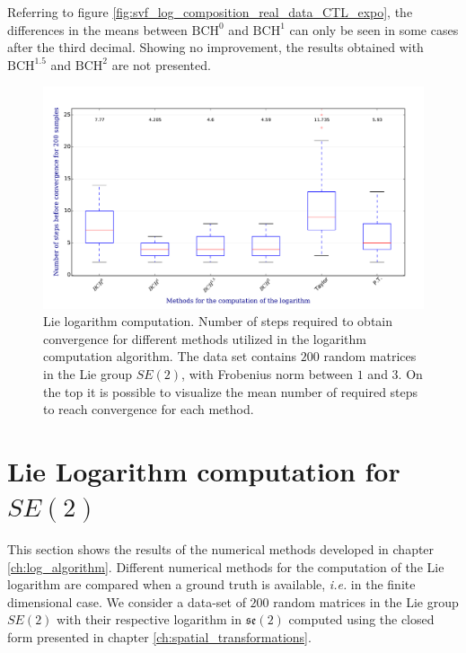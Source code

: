 Referring to figure \ref{fig:svf_log_composition_real_data_CTL_expo}, the differences in the means between $\text{BCH}^0$ and $\text{BCH}^{1}$ can only be seen in some cases after the third decimal. 
Showing no improvement, the results obtained with $\text{BCH}^{1.5}$ and $\text{BCH}^2$ are not presented.

\begin{figure}[!ht]
	\centering
	\includegraphics[scale=0.48]{figures/log_computation_boxplot.pdf}
	\caption{Lie logarithm computation. Number of steps required to obtain convergence for different methods utilized in the logarithm computation algorithm. The data set contains $200$ random matrices in the Lie group $SE(2)$, with Frobenius norm between $1$ and $3$. On the top it is possible to visualize the mean number of required steps to reach convergence for each method.}
	\label{fig:log_computation_boxplot}
\end{figure}

\section{Lie Logarithm computation for $SE(2)$}\label{se:results_lie_logarithm_computations}

This section shows the results of the numerical methods developed in chapter \ref{ch:log_algorithm}. Different numerical methods for the computation of the Lie logarithm are compared when a ground truth is available, \emph{i.e.} in the finite dimensional case. We consider a data-set of $200$ random matrices in the Lie group $SE(2)$ with their respective logarithm in $\mathfrak{se}(2)$ computed using the closed form presented in chapter \ref{ch:spatial_transformations}. 

